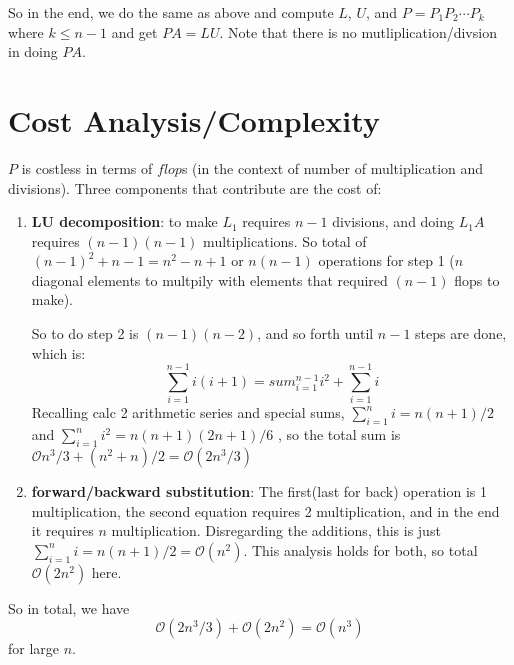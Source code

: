 So in the end, we do the same as above and compute $L$, $U$, and
$P=P_1P_2\cdots P_{k}$ where $k\le n-1$ and get $PA=LU$. Note that there is no
mutliplication/divsion in doing $PA$.

\section{Cost Analysis/Complexity}
$P$ is costless in terms of $flop$s (in the context of number of multiplication and divisions). Three components that contribute
are the cost of:
\begin{enumerate}
\item \textbf{LU decomposition}: to make $L_1$ requires $n-1$ divisions, and
  doing  $L_1A$ requires $(n-1)(n-1)$ multiplications. So total of $(n-1)^2 + n-1
  = n^2-n+1$ or $n(n-1)$ operations for step 1 ($n$ diagonal elements
  to multpily with elements that required $(n-1)$ flops to make).

So to do step 2 is $(n-1)(n-2)$, and so forth until $n-1$ steps are done, which is:
$$\sum_{i=1}^{n-1} i(i+1) = sum_{i=1}^{n-1}i^2 + \sum_{i=1}^{n-1}i$$
Recalling calc 2 arithmetic series and special sums, $\sum_{i=1}^ni =
n(n+1)/2$ and $\sum_{i=1}^ni^2 =n(n+1)(2n+1)/6$ , so the total sum is
$\mathcal{O}n^3/3+(n^2+n)/2 = \mathcal{O}(2n^3/3)$
\item \textbf{forward/backward substitution}: The first(last for back)
  operation is 1 multiplication, the second equation requires 2
  multiplication, and in the end it requires $n$
  multiplication. Disregarding the additions, this is just
  $\sum_{i=1}^n i = n(n+1)/2 = \mathcal{O}(n^2)$. This analysis holds
  for both, so total $\mathcal{O}(2n^2)$ here.
\end{enumerate}
\noi
So in total, we have $$\mathcal{O}(2n^3/3) + \mathcal{O}(2n^2) =
\mathcal{O}(n^3)$$
for large $n$.


